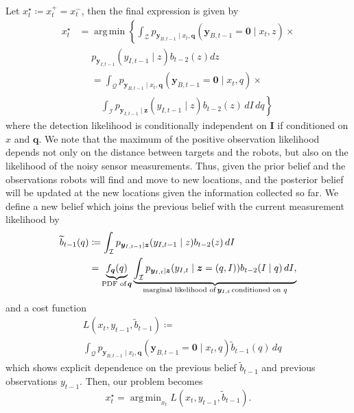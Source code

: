 \documentclass[journal]{IEEEtran}
\DeclareMathOperator*{\argmin}{arg\,min}
\begin{document}
Let ${x}^{\star}_t \coloneqq x_t^+ = x_t^-$, then the final expression is given by
\begin{align*}
{x}_t^{\star} &= \argmin \left\{
\int_\mathcal{Z} 
p_{\bm{y}_{B,t-1}\mid x_t,\bm{q}}(\bm{y}_{B,t-1}=\mathbf{0} \mid x_t,z) \times \right.\\
&\,\,\,\,\,\,\,\,p_{\bm{y}_{I,t-1}}(y_{I,t-1} \mid z)b_{t-2}(z)
dz 
\end{align*}
\begin{align*}
&=  \int_{\mathcal{Q}}
p_{\bm{y}_{B,t-1}\mid x_t,\bm{q}}(\bm{y}_{B,t-1}=\mathbf{0} \mid x_t,q) \times \\
&\,\,\,\,\,\,\left.\int_{\mathcal{I}} 
p_{\bm{y}_{I,t-1}\mid \bm{z}}(y_{I,t-1} \mid z)b_{t-2}(z)
\,dI\,dq \right\}
\end{align*}
where the detection likelihood is conditionally independent on $\bm{I}$ if conditioned on $x$ and $\bm{q}$.
We note that the maximum of the positive observation likelihood depends not only on the distance between targets and the robots, but also on the likelihood of the noisy sensor measurements.
Thus, given the prior belief and the observations robots will find and move to new locations, and the posterior belief will be updated at the new locations given the information collected so far.
We define a new belief which joins the previous belief with the current measurement likelihood by
\begin{align*}
\widetilde{b}_{t-1}(q)
&\coloneqq \int_{\mathcal{I}} 
p_{\bm{y}_{I,t-1}\mid \bm{z}}(y_{I,t-1} \mid z)b_{t-2}(z)\,
dI \\
&=
\underbrace{f_{\bm{q}}(q)}_{\textup{PDF of}\,\bm{q}}\underbrace{\int_{\mathcal{I}} p_{\bm{y}_{I,t} \mid \bm{z}}(y_{I,t}\mid \bm{z} = (q,I))b_{t-2}(I \mid q)\,dI,}_{\textup{marginal likelihood of}\,\bm{y}_{I,t}\,\textup{conditioned on }q}
\end{align*} 
and a cost function 
\begin{align}
&L(x_t,y_{t-1},\widetilde{b}_{t-1})\coloneqq \nonumber \\
&\int_{\mathcal{Q}}
p_{\bm{y}_{B,t-1} \mid
	{x}_{t},\bm{q}}\left(
\bm{y}_{B,t-1} = \bm{0} \mid
{x}_{t},q\right)
\widetilde{b}_{t-1}(q)
\,dq
\label{cost1}
\end{align}
which shows explicit dependence on the previous belief $\tilde{b}_{t-1}$ and previous observations $y_{t-1}$. 
Then, our problem becomes 
\begin{equation}
{x}_t^{\star} = \argmin_{x_t} L(x_t,y_{t-1},\widetilde{b}_{t-1}).
\label{mmle}
\end{equation}
\end{document}

